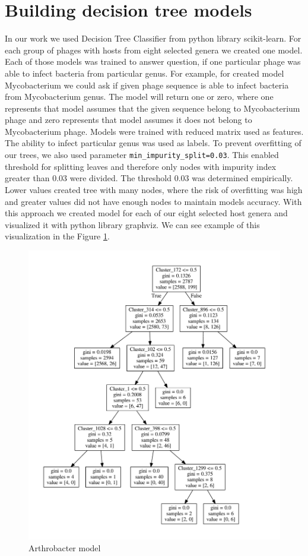 \section{Building decision tree models}
In our work we used Decision Tree Classifier from python library scikit-learn.
For each group of phages with hosts from eight selected genera we created one model.
Each of those models was trained to answer question, if one particular phage was able to infect bacteria from particular genus.
For example, for created model Mycobacterium we could ask if given phage sequence is able to infect bacteria from Mycobacterium genus.
The model will return one or zero, where one represents that model assumes that the given sequence belong to Mycobacterium phage and zero represents that model assumes it does not belong to Mycobacterium phage.
Models were trained with reduced matrix used as features.
The ability to infect particular genus was used as labels.
To prevent overfitting of our trees, we also used parameter \verb|min_impurity_split=0.03|.
This enabled threshold for splitting leaves and therefore only nodes with impurity index greater than 0.03 were divided.
The threshold 0.03 was determined empirically.
Lower values created tree with many nodes, where the risk of overfitting was high and greater values did not have enough nodes to maintain models accuracy.
With this approach we created model for each of our eight selected host genera and visualized it with python library graphviz.
We can see example of this visualization in the Figure \ref{fig:tree}.

\begin{figure}[htp]
\includegraphics[width=\linewidth]{./images/tree.pdf}
\centering
\caption{Arthrobacter model}
\label{fig:tree}
\end{figure}

